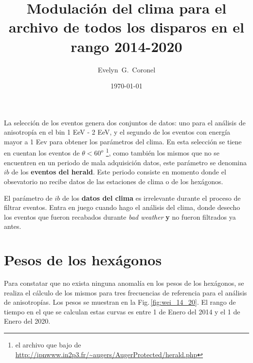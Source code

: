 



\title{Modulación del clima para el archivo de todos los disparos en el rango 2014-2020}
\author{Evelyn~G.~Coronel}


\date[]{\lowercase{\today}} %


\maketitle

La selección de los eventos genera dos conjuntos de datos: uno para el análisis de anisotropía en el bin 1 EeV - 2 EeV, y el segundo de los eventos con energía mayor a 1 Eev para obtener los parámetros del clima. En esta selección se tiene en cuentan los eventos de $\theta < 60^o$ \footnote{el archivo que bajo de \url{http://ipnwww.in2p3.fr/~augers/AugerProtected/herald.php} }, como también  los mismos que no se encuentren en un periodo de mala adquisición datos, este parámetro se denomina $ib$ de los \textbf{eventos del herald}. Este periodo consiste en momento donde el obsevatorio no recibe datos de las estaciones de clima o de los hexágonos. 

El parámetro de $ib$ de los \textbf{datos del clima} es irrelevante durante el proceso de filtrar eventos. Entra en juego cuando hago el análisis del clima, donde desecho los eventos que fueron recabados durante \emph{bad weather} \textbf{y} no fueron filtrados ya antes. 


\section{Pesos de los hexágonos}

Para constatar que no exista ninguna anomalía en los pesos de los hexágonos, se realiza el cálculo de los mismos para tres frecuencias de referencia para el análisis de anisotropías.  Los pesos se muestran en la Fig.\,\ref{fig:wei_14_20}. El rango de tiempo en el que se calculan estas curvas es entre 1 de Enero del 2014 y el 1 de Enero del 2020.

